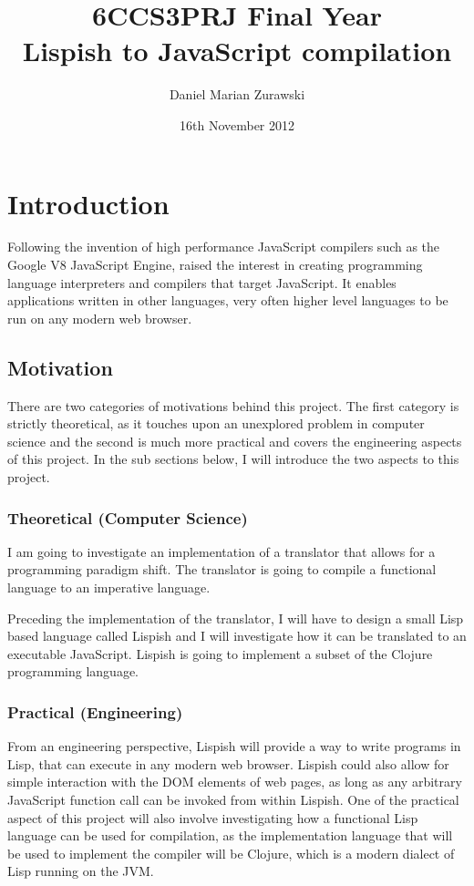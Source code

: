 \documentclass[11pt]{informatics-report}
\title{6CCS3PRJ Final Year\\\vspace{0.2cm}Lispish to JavaScript compilation}
\author{Daniel Marian Zurawski}
\date{16th November 2012}
\begin{document}
\createFrontMatter
\onehalfspacing
\tableofcontents
\doublespacing


\chapter{Introduction}
Following the invention of high performance JavaScript compilers such as the Google V8 JavaScript Engine, raised the interest in creating programming language interpreters and compilers that target JavaScript. It enables applications written in other languages, very often higher level languages to be run on any modern web browser. \\
 
 \section{Motivation}
There are two categories of motivations behind this project. The first category is strictly theoretical, as it touches upon an unexplored problem in computer science and the second is much more practical and covers the engineering aspects of this project. In the sub sections below, I will introduce the two aspects to this project. 

\subsection{Theoretical (Computer Science)}
I am going to investigate an implementation of a translator that allows for a programming paradigm shift. The translator is going to compile a functional language to an imperative language. 

Preceding the implementation of the translator, I will have to design a small Lisp based language called Lispish and I will investigate how it can be translated to an executable JavaScript. Lispish is going to implement a subset of the Clojure programming language.

\subsection{Practical (Engineering)}
From an engineering perspective, Lispish will provide a way to write programs in Lisp, that can execute in any modern web browser. Lispish could also allow for simple interaction with the DOM elements of web pages, as long as any arbitrary JavaScript function call can be invoked from within Lispish.
One of the practical aspect of this project will also involve investigating how a functional Lisp language can be used for compilation, as the implementation language that will be used to implement the compiler will be Clojure, which is a modern dialect of Lisp running on the JVM.  
\end{document}
